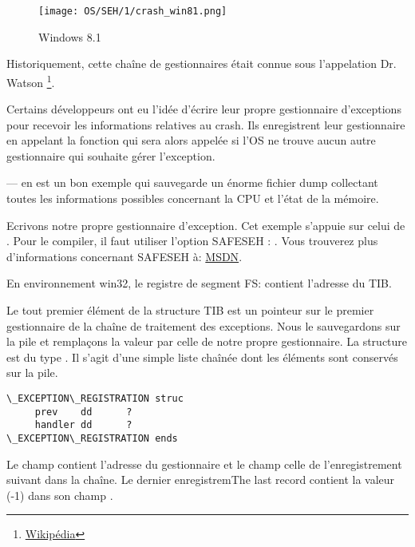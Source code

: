 \begin{figure}[H]
\centering
\texttt{[image: OS/SEH/1/crash\_win81.png]}
\caption{Windows 8.1}
\end{figure}

Historiquement, cette chaîne de gestionnaires était connue sous l'appelation Dr. Watson
\footnote{\href{http://go.yurichev.com/17046}{Wikipédia}}.

Certains développeurs ont eu l'idée d'écrire leur propre gestionnaire d'exceptions pour recevoir 
les informations relatives au crash.
Ils enregistrent leur gestionnaire en appelant la fonction  qui 
sera alors appelée si l'\ac{OS} ne trouve aucun autre gestionnaire qui souhaite gérer l'exception.

\myindex{\oracle}
\oracle--- en est un bon exemple qui sauvegarde un énorme fichier dump collectant toutes les 
informations possibles concernant la \ac{CPU} et l'état de la mémoire.

Ecrivons notre propre gestionnaire d'exception. Cet exemple s'appuie sur celui de \PietrekSEH.
Pour le compiler, il faut utiliser l'option SAFESEH : .
Vous trouverez plus d'informations concernant SAFESEH à: \href{http://go.yurichev.com/17252}{MSDN}.



En environnement win32, le registre de segment FS: contient l'adresse du \ac{TIB}.

Le tout premier élément de la structure \ac{TIB} est un pointeur sur le premier gestionnaire de la 
chaîne de traitement des exceptions.
Nous le sauvegardons sur la pile et remplaçons la valeur par celle de notre propre gestionnaire.
La structure est du type . Il s'agit d'une simple liste chaînée dont 
les éléments sont conservés sur la pile.

\begin{lstlisting}[caption=MSVC/VC/crt/src/exsup.inc,style=customasmx86]
\_EXCEPTION\_REGISTRATION struc
     prev    dd      ?
     handler dd      ?
\_EXCEPTION\_REGISTRATION ends
\end{lstlisting}

Le champ  contient l'adresse du gestionnaire et le champ  celle de 
l'enregistrement suivant dans la chaîne.
Le dernier enregistremThe last record contient la valeur  (-1) dans son champ .

